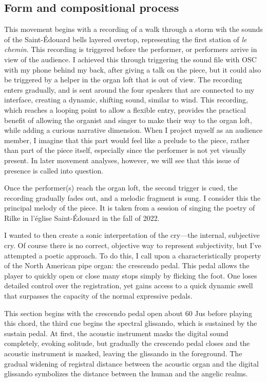 \documentclass[12pt,twoside,maitrise]{dms_ks}
\theoremstyle{definition}
\begin{document}
\subsection{Form and compositional process}

This movement begins with a recording of a walk through a storm wih the sounds of the Saint-Édouard bells layered overtop, representing the first station of \textit{le chemin}.
This recording is triggered before the performer, or performers arrive in view of the audience.
I achieved this through triggering the sound file with OSC with my phone behind my back, after giving a talk on the piece, but it could also be triggered by a helper in the organ loft that is out of view.
The recording enters gradually, and is sent around the four speakers that are connected to my interface, creating a dynamic, shifting sound, similar to wind.
This recording, which reaches a looping point to allow a flexible entry, provides the practical benefit of allowing the organist and singer to make their way to the organ loft, while adding a curious narrative dimension.
When I project myself as an audience member, I imagine that this part would feel like a prelude to the piece, rather than part of the piece itself, especially since the performer is not yet visually present.
In later movement analyses, however, we will see that this issue of presence is called into question.

Once the performer(s) reach the organ loft, the second trigger is cued, the recording gradually fades out, and a melodic fragment is sung.
I consider this the principal melody of the piece.
It is taken from a session of singing the poetry of Rilke in l'église Saint-Édouard in the fall of 2022.


I wanted to then create a sonic interpretation of the cry---the internal, subjective cry.
Of course there is no correct, objective way to represent subjectivity, but I've attempted a poetic approach.
To do this, I call upon a characteristically property of the North American pipe organ: the crescendo pedal.
This pedal allows the player to quickly open or close many stops simply by flicking the foot.
One loses detailed control over the registration, yet gains access to a quick dynamic swell that surpasses the capacity of the normal expressive pedals.

This section begins with the crescendo pedal open about 60%
Jus before playing this chord, the third cue begins the spectral glissando, which is sustained by the sustain pedal.
At first, the acoustic instrument masks the digital sound completely, evoking solitude, but gradually the crescendo pedal closes and the acoustic instrument is masked, leaving the glissando in the foreground.
The gradual widening of registral distance between the acoustic organ and the digital glissando symbolizes the distance between the human and the angelic realms.
\end{document}
